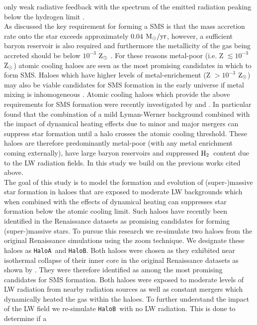 \documentclass[graphics, twocolumn, usenatbib]{mn2e}
\newcommand{\msolaryrc} {$\rm{M_{\odot}/yr}$}
\newcommand{\zsolar} {$\rm{Z_{\odot}}~$}
\newcommand{\zsolarc} {$\rm{Z_{\odot}}$}
\newcommand{\molH} {$\rm{H_2}$~}
\newcommand{\ha} {\texttt{HaloA~}}
\newcommand{\hb} {\texttt{HaloB~}}
\newcommand{\hbc} {\texttt{HaloB}}
\begin{document}
only weak radiative feedback with the spectrum of the emitted radiation peaking below the hydrogen limit \citep{Woods_2018}. \\
\indent As discussed the key requirement for
forming a SMS is that the mass accretion rate onto the star exceeds approximately 0.04 \msolaryrc,
however, a sufficient baryon reservoir is also required and furthermore the metallicity of the gas
being accreted should be below $10^{-3}$ \zsolar \citep{Chon_2020}. For these reasons
metal-poor (i.e. Z $\lesssim 10^{-3}$ \zsolarc) atomic cooling haloes are seen as the most 
promising candidates in which to form SMS. Haloes which have higher levels of 
metal-enrichement (Z $> 10^{-3}$ \zsolarc) may also be viable candidates for 
SMS formation in the early universe if metal mixing is inhomogeneous \citep{Regan_2020a}. Atomic cooling haloes which provide the above requirements for SMS formation were recently investigated by \cite{Wise_2019} and \cite{Regan_2020}. In particular \cite{Wise_2019} found that the combination 
of a mild Lyman-Werner background combined with the impact of dynamical heating effects due to minor and major mergers can suppress star formation until a halo crosses the atomic cooling threshold. These haloes are therefore predominantly metal-poor (with any metal enrichment coming externally), have large 
baryon reservoirs and suppressed \molH content due to the LW radiation fields. 
In this study we build on the previous works cited above. \\
\indent The goal of this study is to model the formation and evolution of (super-)massive star
  formation in haloes that are exposed to moderate LW backgrounds which when combined with the effects
  of dynamical heating can suppresses star formation below the atomic cooling limit.
  Such haloes have recently been identified in the Renaissance datasets \citep{Wise_2019, Regan_2020}
  as promising candidates for forming (super-)massive stars.  To pursue this research we re-simulate
  two haloes from the original Renaissance simulations using the zoom technique. We designate
  these haloes as \ha and \hbc. Both haloes were chosen as they exhibited near isothermal
  collapse of their inner core in the original Renaissance datasets as shown by \cite{Regan_2020}.
  They were therefore identified as among the most promising candidates for SMS formation. Both
  haloes were exposed to moderate levels of LW radiation from nearby radiation sources as well as
  constant mergers which dynamically heated the gas within the haloes. To further understand the
  impact of the LW field we re-simulate \hb with no LW radiation. This is done to determine if a
\end{document}
